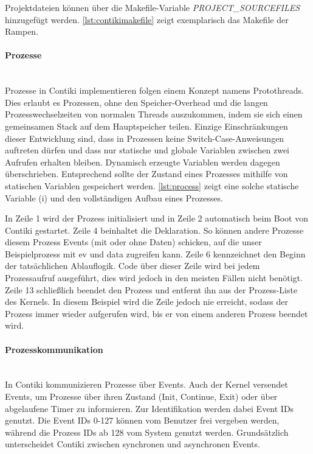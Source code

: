 Projektdateien können über die Makefile-Variable \textit{PROJECT\_SOURCEFILES} hinzugefügt werden. \autoref{lst:contikimakefile} zeigt exemplarisch das Makefile der Rampen.




\paragraph{Prozesse}\mbox{}\\
Prozesse in Contiki implementieren folgen einem Konzept namens Protothreads. Dies erlaubt es Prozessen, ohne den Speicher-Overhead und die langen 
Prozesswechselzeiten von normalen Threads auszukommen, indem sie sich einen gemeinsamen Stack auf dem Hauptspeicher teilen.
Einzige Einschränkungen dieser Entwicklung sind, dass in Prozessen keine Switch-Case-Anweisungen auftreten dürfen und dass nur statische und globale Variablen zwischen zwei Aufrufen erhalten bleiben. Dynamisch erzeugte Variablen werden dagegen überschrieben. Entsprechend sollte der Zustand eines Prozesses mithilfe von statischen Variablen gespeichert werden. \autoref{lst:process} zeigt eine solche statische Variable (i) und den vollständigen Aufbau eines Prozesses.



In Zeile 1 wird der Prozess initialisiert und in Zeile 2 automatisch beim Boot von Contiki gestartet. Zeile 4 beinhaltet die Deklaration. So können andere Prozesse diesem Prozess Events (mit oder ohne Daten) schicken, auf die unser Beispielprozess mit ev und data zugreifen kann. Zeile 6 kennzeichnet den Beginn der tatsächlichen Ablauflogik. Code über dieser Zeile wird bei jedem Prozessaufruf ausgeführt, dies wird jedoch in den meisten Fällen nicht benötigt. Zeile 13 schließlich beendet den Prozess und entfernt ihn aus der Prozess-Liste des Kernels. In diesem Beispiel wird die Zeile jedoch nie erreicht, sodass der Prozess immer wieder aufgerufen wird, bis er von einem anderen Prozess beendet wird.

\paragraph{Prozesskommunikation}\mbox{}\\
In Contiki kommunizieren Prozesse über Events. Auch der Kernel versendet Events, um Prozesse über ihren Zustand (Init, Continue, Exit) oder über abgelaufene Timer zu informieren. Zur Identifikation werden dabei Event IDs genutzt. Die Event IDs 0-127 können vom Benutzer frei vergeben werden, während die Prozess IDs ab 128 vom System genutzt werden. Grundsätzlich unterscheidet Contiki zwischen synchronen und asynchronen Events. 


